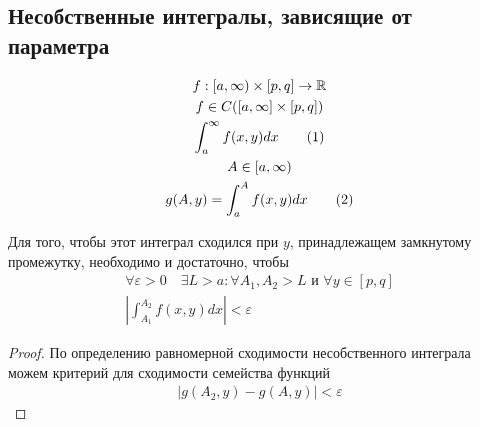 \documentclass[main]{subfiles}
\begin{document}
     \subsection*{Несобственные интегралы, зависящие от параметра}
     \begin{definition}
          \begin{gather*}
               f: [a, \infty) \times [p,q] \rightarrow \mathbb{R} \\
               f \in C([a,\infty] \times [p,q]) \\
               \int^\infty_a f(x,y) dx \tag{1} \\
               A \in [a,\infty) \\
               g(A,y) = \int^A_a f(x,y) dx \tag{2}
          \end{gather*}
     \end{definition}
     \begin{theorem}
          Для того, чтобы этот интеграл сходился при $y$, принадлежащем замкнутому промежутку, необходимо и достаточно, чтобы
          \begin{gather*}
               \forall \varepsilon > 0 \quad \exists L > a : \forall A_1, A_2 > L \text{ и } \forall y \in [p,q] \\
               \left | \int^{A_2}_{A_1}  f(x,y) dx \right | < \varepsilon \tag{4}  
          \end{gather*}
     \end{theorem}
     \begin{proof}
          По определению равномерной сходимости несобственного интеграла можем критерий для сходимости семейства функций
          \begin{gather*}
               |g(A_2,y) - g(A,y)| < \varepsilon \tag{5}
          \end{gather*}
     \end{proof}
\end{document}
